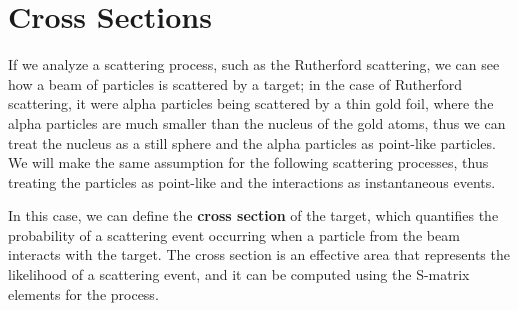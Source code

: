 \section{Cross Sections}

If we analyze a scattering process, such as the Rutherford scattering, we can see how a beam of particles is scattered by a target; in the case of Rutherford scattering, it were alpha particles being scattered by a thin gold foil, where the alpha particles are much smaller than the nucleus of the gold atoms, thus we can treat the nucleus as a still sphere and the alpha particles as point-like particles. We will make the same assumption for the following scattering processes, thus treating the particles as point-like and the interactions as instantaneous events.

In this case, we can define the \textbf{cross section} of the target, which quantifies the probability of a scattering event occurring when a particle from the beam interacts with the target. The cross section is an effective area that represents the likelihood of a scattering event, and it can be computed using the S-matrix elements for the process.

